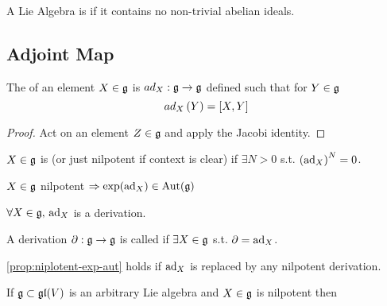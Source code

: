 \documentclass{article}
\begin{document}
\begin{definition}
	A Lie Algebra is  if it contains no non-trivial abelian ideals. 
\end{definition}

\subsection{Adjoint Map}

\begin{definition}
	The  of an element $X\in\mf{g}$ is $ad_{X}:\mf{g}\to\mf{g}$ defined such that for $Y\in\mf{g}$
	\[
	ad_{X}\left(Y\right)=\comm[X]{Y}
	\]
\end{definition}

\begin{lemma}
\end{lemma}
\begin{proof}
	Act on an element $Z \in \mf{g}$ and apply the Jacobi identity.
\end{proof}

\begin{definition}
	$X \in \mf{g}$ is  (or just nilpotent if context is clear) if $\exists N>0$ s.t. $\pround{\ad_X}^N=0$.
\end{definition}

\begin{prop}\label{prop:niplotent-exp-aut}
	$X\in \mf{g}$ nilpotent $\Rightarrow \exp(\ad_X) \in \Aut(\mf{g})$
\end{prop}

\begin{prop}
	$\forall X \in \mf{g}, \, \ad_X$ is a derivation.  
\end{prop}

\begin{definition}
A derivation $\del:\mf{g} \to \mf{g}$ is called  if $\exists X \in \mf{g}$ s.t. $\del = \ad_X$. 
\end{definition}

\begin{remark}
\ref{prop:niplotent-exp-aut} holds if $\ad_X$ is replaced by any nilpotent derivation.
\end{remark}

\begin{prop}
	If $\mf{g}\subset \mf{gl}(V)$ is an arbitrary Lie algebra and $X\in \mf{g}$ is nilpotent then 
\end{prop}
\end{document}
